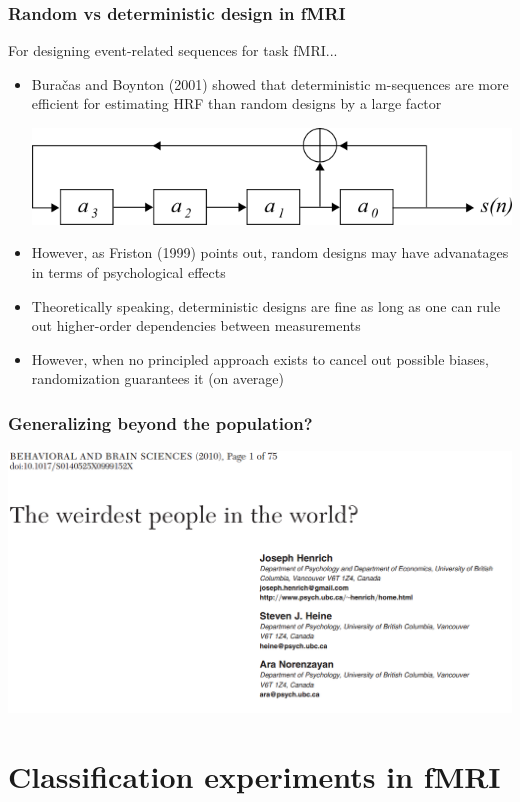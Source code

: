 \documentclass{beamer}
\begin{document}
\begin{frame}
\frametitle{Random vs deterministic design in fMRI}
For designing event-related sequences for task fMRI...
\begin{itemize}
\item Bura\v{c}as and Boynton (2001) showed that deterministic m-sequences are more efficient for estimating HRF than random designs by a large factor
\begin{center}
\includegraphics[scale = 0.2]{MLS_shiftregisters_L4.png}
\end{center}
\item However, as Friston (1999) points out, random designs may have advanatages in terms of psychological effects \pause
\item Theoretically speaking, deterministic designs are fine as long as one can rule out higher-order dependencies between measurements \pause
\item However, when no principled approach exists to cancel out possible biases, randomization guarantees it (on average)
\end{itemize}
\end{frame}

\begin{frame}
\frametitle{Generalizing beyond the population?}
\begin{center}
\includegraphics[scale = 0.3]{weird_people.png}
\end{center}
\end{frame}


\section{Classification experiments in fMRI}
\end{document}
